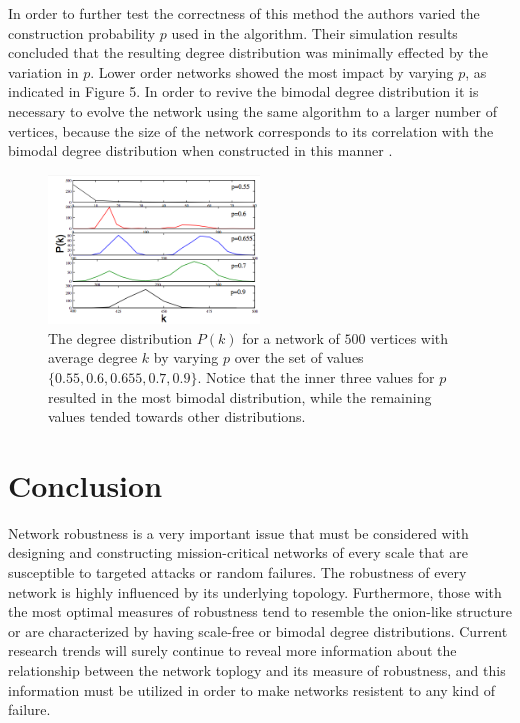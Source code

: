 \documentclass[doc]{apa}%
\begin{document}
In order to further test the correctness of this method the authors varied the construction probability $p$ used in the algorithm. Their simulation results concluded that the resulting degree distribution was minimally effected by the variation in $p$. Lower order networks showed the most impact by varying $p$, as indicated in Figure 5. In order to revive the bimodal degree distribution it is necessary to evolve the network using the same algorithm to a larger number of vertices, because the size of the network corresponds to its correlation with the bimodal degree distribution when constructed in this manner \cite{bimodal}.

\begin{figure}[h!]
	\label{fig:distribution}
	\centering
		\includegraphics[width=0.5\textwidth]{evol_distribution.png}
	\caption{The degree distribution $P(k)$ for a network of $500$ vertices with average degree $k$ by varying $p$ over the set of values $\{0.55, 0.6, 0.655, 0.7, 0.9\}$. Notice that the inner three values for $p$ resulted in the most bimodal distribution, while the remaining values tended towards other distributions.}
\end{figure}

\section{Conclusion}
Network robustness is a very important issue that must be considered with designing and constructing mission-critical networks of every scale that are susceptible to targeted attacks or random failures. The robustness of every network is highly influenced by its underlying topology. Furthermore, those with the most optimal measures of robustness tend to resemble the onion-like structure or are characterized by having scale-free or bimodal degree distributions. Current research trends will surely continue to reveal more information about the relationship between the network toplogy and its measure of robustness, and this information must be utilized in order to make networks resistent to any kind of failure. 


\end{document}
